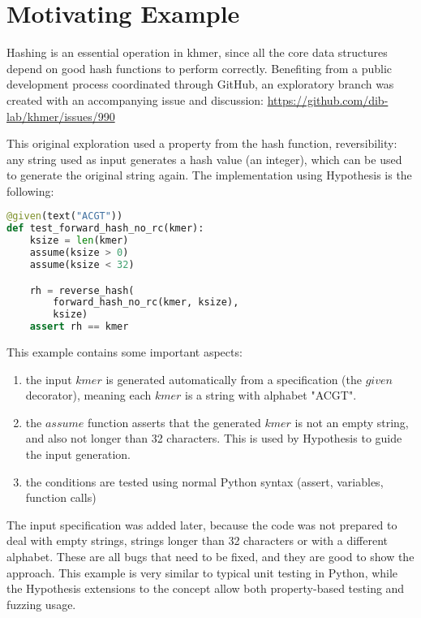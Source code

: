 \documentclass[preprint,nocopyrightspace]{sig-alternate}
\begin{document}
\section{Motivating Example}

Hashing is an essential operation in khmer,
since all the core data structures depend on good hash functions to perform correctly.
Benefiting from a public development process coordinated through GitHub,
an exploratory branch was created with an accompanying issue and discussion:
\url{https://github.com/dib-lab/khmer/issues/990}

This original exploration used a property from the hash function,
reversibility:
any string used as input generates a hash value (an integer),
which can be used to generate the original string again.
The implementation using Hypothesis is the following:

\begin{lstlisting}[language=Python,basicstyle=\small\tt,caption={Motivating example: testing a reversible hash function},label={revhash}]
@given(text("ACGT"))
def test_forward_hash_no_rc(kmer):
    ksize = len(kmer)
    assume(ksize > 0)
    assume(ksize < 32)

    rh = reverse_hash(
        forward_hash_no_rc(kmer, ksize),
        ksize)
    assert rh == kmer
\end{lstlisting}

This example contains some important aspects:
\begin{enumerate}
\item the input $kmer$ is generated automatically from a specification (the $given$ decorator),
meaning each $kmer$ is a string with alphabet "ACGT".
\item the $assume$ function asserts that the generated $kmer$ is not an empty string,
and also not longer than 32 characters.
This is used by Hypothesis to guide the input generation.
\item the conditions are tested using normal Python syntax (assert, variables, function calls)
\end{enumerate}

The input specification was added later,
because the code was not prepared to deal with empty strings,
strings longer than 32 characters or with a different alphabet.
These are all bugs that need to be fixed,
and they are good to show the approach.
This example is very similar to typical unit testing in Python,
while the Hypothesis extensions to the concept allow both property-based testing and fuzzing usage.
\end{document}
